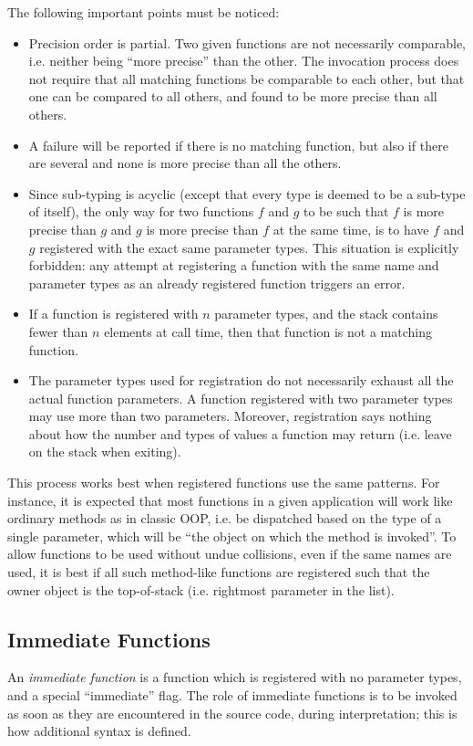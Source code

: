 The following important points must be noticed:
\begin{itemize}

    \item Precision order is partial. Two given functions are not
    necessarily comparable, i.e. neither being ``more precise'' than
    the other. The invocation process does not require that all matching
    functions be comparable to each other, but that one can be compared
    to all others, and found to be more precise than all others.

    \item A failure will be reported if there is no matching function,
    but also if there are several and none is more precise than all the
    others.

    \item Since sub-typing is acyclic (except that every type is deemed
    to be a sub-type of itself), the only way for two functions $f$ and
    $g$ to be such that $f$ is more precise than $g$ and $g$ is more
    precise than $f$ at the same time, is to have $f$ and $g$ registered
    with the exact same parameter types. This situation is explicitly
    forbidden: any attempt at registering a function with the same name
    and parameter types as an already registered function triggers an
    error.

    \item If a function is registered with $n$ parameter types, and the
    stack contains fewer than $n$ elements at call time, then that
    function is not a matching function.

    \item The parameter types used for registration do not necessarily
    exhaust all the actual function parameters. A function registered
    with two parameter types may use more than two parameters. Moreover,
    registration says nothing about how the number and types of values a
    function may return (i.e. leave on the stack when exiting).

\end{itemize}

This process works best when registered functions use the same patterns.
For instance, it is expected that most functions in a given application
will work like ordinary methods as in classic OOP, i.e. be dispatched
based on the type of a single parameter, which will be ``the object on
which the method is invoked''. To allow functions to be used without
undue collisions, even if the same names are used, it is best if all
such method-like functions are registered such that the owner object is
the top-of-stack (i.e. rightmost parameter in the list).

\subsection{Immediate Functions}

An \emph{immediate function} is a function which is registered with no
parameter types, and a special ``immediate'' flag. The role of immediate
functions is to be invoked as soon as they are encountered in the source
code, during interpretation; this is how additional syntax is defined.
